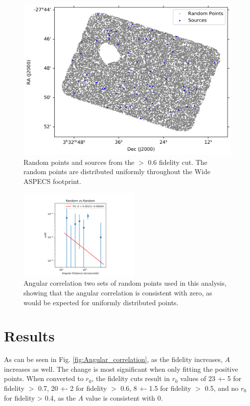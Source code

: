 \begin{figure}[tbp]
\centering \includegraphics[width=120mm]{PDFS/NX_V_Y_Sources_20000.png}
\caption{Random points and sources from the $>$ 0.6 fidelity cut. The random points are distributed uniformly throughout the Wide ASPECS footprint.}
\label{fig:Clustering_points}
\end{figure}

\begin{figure}[tbp]
\centering \includegraphics[width=60mm]{clustering/Log_Random_vs_Random_15000NoParenFlip_bin10.png}
\caption{Angular correlation two sets of random points used in this analysis, showing that the angular correlation is consistent with zero, as would be expected for uniformly distributed points.}
\label{fig:random_points}
\end{figure}



\section{Results}

As can be seen in Fig. \ref{fig:Angular_correlation}, as the fidelity increases, $A$ increases as well. The change is most significant when only fitting the positive points.  When converted to $r_0$, the fidelity cuts result in $r_0$ values of 23 +- 5 for fidelity $>$ 0.7, 20 +- 2 for fidelity $>$ 0.6, 8 +- 1.5 for fidelity $>$ 0.5, and no $r_0$ for fidelity > 0.4, as the $A$ value is consistent with 0. 

